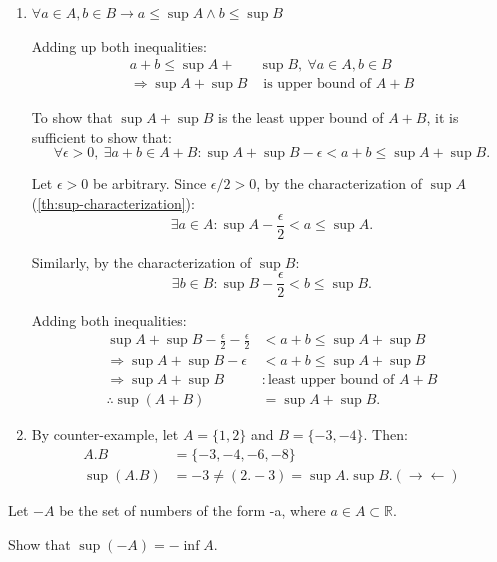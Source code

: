 \begin{solution}
\begin{enumerate}[label=\roman*)]
	\item $\forall a \in A, b \in B \rightarrow a \leq \sup{A} \wedge b \leq \sup{B}$

	Adding up both inequalities:
	\begin{align*}
	a + b \leq \sup{A} + &\sup{B}, \ \forall a \in A, b \in B \\
	\Rightarrow \sup{A} + \sup{B} &\text{ is upper bound of } A + B
	\end{align*}

	To show that $\sup{A} + \sup{B}$ is the least upper bound of $A+B$, it is sufficient to show that:
	$$
	\forall \epsilon > 0,\ \exists a+b \in A+B:
	\sup{A} + \sup{B} - \epsilon < a+b \leq \sup{A} + \sup{B}.
	$$

	Let $\epsilon > 0$ be arbitrary. Since $\epsilon/2 > 0$, by the characterization of $\sup{A}$ (\cref{th:sup-characterization}):
	$$
	\exists a \in A:
	\sup{A} - \frac{\epsilon}{2} < a \leq \sup{A}.
	$$

	Similarly, by the characterization of $\sup{B}$:
	$$
	\exists b \in B:
	\sup{B} - \frac{\epsilon}{2} < b \leq \sup{B}.
	$$

	Adding both inequalities:
	\begin{align*}
	\sup{A} + \sup{B} - \frac{\epsilon}{2} - \frac{\epsilon}{2}
	&< a+b \leq \sup{A} + \sup{B} \\
	\Rightarrow \sup{A} + \sup{B} - \epsilon
	&< a+b \leq \sup{A} + \sup{B} \\
	\Rightarrow \sup{A} + \sup{B}&: \text{least upper bound of } A+B \\
	\therefore \sup{(A+B)} &= \sup{A} + \sup{B}.
	\end{align*}

	\item By counter-example, let $A = \{1,2\}$ and $B = \{-3,-4\}$. Then:
	\begin{align*}
	A.B &= \{-3,-4,-6,-8\} \\
	\sup{(A.B)} &= -3 \neq (2.-3) = \sup{A}.\sup{B}. (\rightarrow\leftarrow)
	\end{align*}
\end{enumerate}
\end{solution}

\begin{problem}
Let $-A$ be the set of numbers of the form -a, where $a \in A \subset \mathbb{R}$.

Show that $\sup{(-A)} = -\inf{A}$.
\end{problem}

